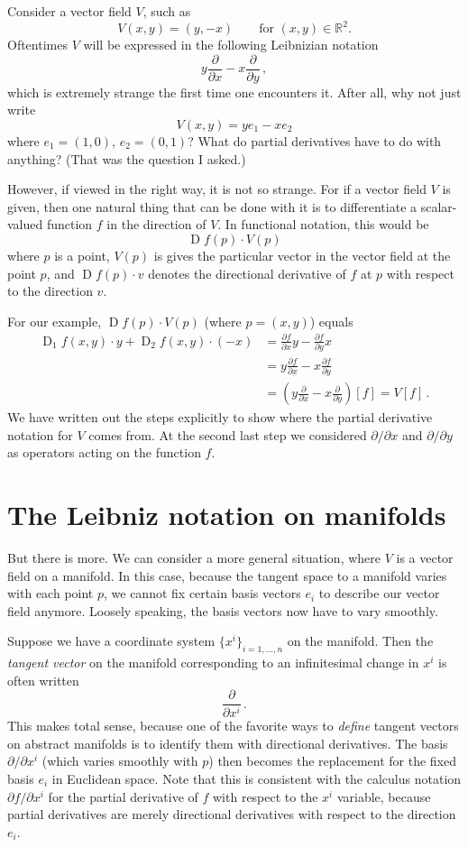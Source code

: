 \documentclass[12pt]{article}
\newcommand{\real}{\mathbb{R}}
\DeclareMathOperator{\D}{D}
\begin{document}
Consider a vector field $V$,
such as 
\[
V(x, y) = (y, -x) \qquad \text{for $(x,y) \in \real^2$.}
\]
Oftentimes $V$ will be expressed in the following Leibnizian notation
\[
y \frac{\partial}{\partial x} - x \frac{\partial}{\partial y}\,,
\]
which is extremely strange the first time one encounters it.  After all, why
not just
write
\[
V(x, y) = y e_1 - x e_2
\]
where $e_1 = (1, 0)$, $e_2 = (0, 1)$?
What do partial derivatives have to do with anything?
(That was the question I asked.)

However, if viewed in the right way, it is not so strange.
For if a vector field $V$ is given, then one natural thing that can be done
with it is to differentiate a scalar-valued function $f$
in the direction of $V$.
In functional notation, this would be
\[
\D f(p) \cdot V(p)
\]
where $p$ is a point, $V(p)$ is gives the particular vector
in the vector field at the point $p$, and $\D f(p) \cdot v$
denotes the directional derivative of $f$ at $p$ with respect
to the direction $v$.

For our example, $\D f(p) \cdot V(p)$ (where $p = (x,y)$) equals
\begin{align*}
\D_1 f(x,y) \cdot y + \D_2 f(x,y) \cdot (-x)
&= 
\frac{\partial f}{\partial x} y - \frac{\partial f}{\partial y} x \\
&=
y \frac{\partial f}{\partial x} - x \frac{\partial f}{\partial y} \\
&=
\left( y \frac{\partial}{\partial x} - x \frac{\partial}{\partial y}\right) [f] = V[f]\,.
\end{align*}
We have written out the steps explicitly to show
where the partial derivative notation for $V$ comes from.
At the second last step we considered $\partial / \partial x$
and $\partial / \partial y$ as operators acting on the
function $f$.

\section*{The Leibniz notation on manifolds}

But there is more.  We can consider a more general situation,
where $V$ is a vector field on a manifold.
In this case, because the tangent space to a manifold varies
with each point $p$, we cannot fix certain basis vectors
$e_i$ to describe our vector field anymore.
Loosely speaking, the basis vectors now have to vary smoothly.

Suppose we have a coordinate system $\{ x^i \}_{i = 1, \dotsc, n}$ on the manifold.
Then the \emph{tangent vector} on the manifold corresponding to an infinitesimal
change in $x^i$
is often written
\[
\frac{\partial}{\partial x^i}\,.
\]
This makes total sense, because one of the favorite ways to \emph{define}
tangent vectors on abstract manifolds is to identify them
with directional derivatives.  The basis $\partial/\partial x^i$ (which
varies smoothly with $p$)
then becomes the replacement for the fixed basis $e_i$ in Euclidean space.
Note that this is consistent with the calculus notation
$\partial f/\partial x^i$ for the partial derivative of
$f$ with respect to the $x^i$ variable,
because partial derivatives are merely directional derivatives
with respect to the direction $e_i$.
\end{document}
